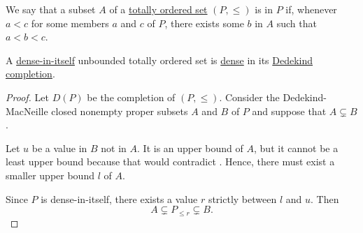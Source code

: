\begin{definition}\label{def:dense_total_order}
  We say that a subset \( A \) of a \hyperref[def:totally_ordered_set]{totally ordered set} \( (P, \leq) \) is  in \( P \) if, whenever \( a < c \) for some members \( a \) and \( c \) of \( P \), there exists some \( b \) in \( A \) such that \( a < b < c \).
\end{definition}

\begin{proposition}\label{thm:dedekind_completion_dense}
  A \hyperref[def:dense_total_order]{dense-in-itself} unbounded totally ordered set is \hyperref[def:dense_total_order]{dense} in its \hyperref[def:dedekind_completion]{Dedekind completion}.
\end{proposition}
\begin{proof}
  Let \( D(P) \) be the completion of \( (P, \leq) \). Consider the Dedekind-MacNeille closed nonempty proper subsets \( A \) and \( B \) of \( P \) and suppose that \( A \subsetneq B \).

  Let \( u \) be a value in \( B \) not in \( A \). It is an upper bound of \( A \), but it cannot be a least upper bound because that would contradict . Hence, there must exist a smaller upper bound \( l \) of \( A \).

  Since \( P \) is dense-in-itself, there exists a value \( r \) strictly between \( l \) and \( u \). Then
  \begin{equation*}
    A \subsetneq P_{\leq r} \subsetneq B.
  \end{equation*}
\end{proof}
